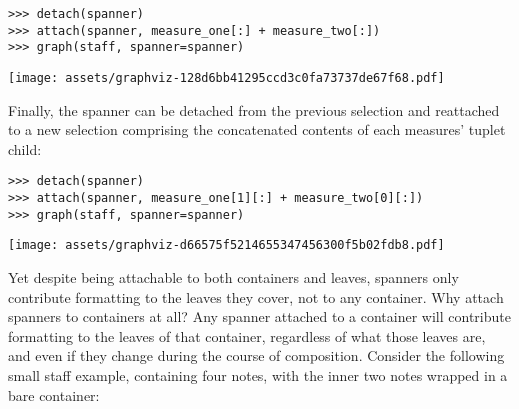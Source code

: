 \begin{abjadbookoutput}
\begin{singlespacing}
\vspace{-0.5\baselineskip}
\begin{lstlisting}
>>> detach(spanner)
>>> attach(spanner, measure_one[:] + measure_two[:])
>>> graph(staff, spanner=spanner)
\end{lstlisting}
\noindent\texttt{[image: assets/graphviz-128d6bb41295ccd3c0fa73737de67f68.pdf]}
\end{singlespacing}
\end{abjadbookoutput}

\noindent Finally, the spanner can be detached from the previous selection and
reattached to a new selection comprising the concatenated contents of each
measures' tuplet child:

\begin{comment}
<abjad>
detach(spanner)
attach(spanner, measure_one[1][:] + measure_two[0][:])
graph(staff, spanner=spanner)
</abjad>
\end{comment}

\begin{abjadbookoutput}
\begin{singlespacing}
\vspace{-0.5\baselineskip}
\begin{lstlisting}
>>> detach(spanner)
>>> attach(spanner, measure_one[1][:] + measure_two[0][:])
>>> graph(staff, spanner=spanner)
\end{lstlisting}
\noindent\texttt{[image: assets/graphviz-d66575f5214655347456300f5b02fdb8.pdf]}
\end{singlespacing}
\end{abjadbookoutput}

\noindent Yet despite being attachable to both containers and leaves, spanners
only contribute formatting to the leaves they cover, not to any container. Why
attach spanners to containers at all? Any spanner attached to a container will
contribute formatting to the leaves of that container, regardless of what those
leaves are, and even if they change during the course of composition. Consider
the following small staff example, containing four notes, with the inner two
notes wrapped in a bare container:

\begin{comment}
<abjad>
staff = Staff("c'4 { d'4 e'4 } f'4")
show(staff)
</abjad>
\end{comment}

